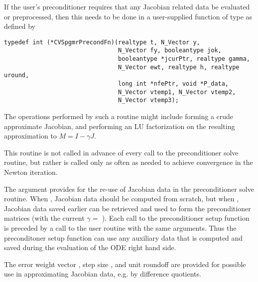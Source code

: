 \begin{itemize}
  If the user's preconditioner requires that any Jacobian related data
  be evaluated or preprocessed, then this needs to be done in a
  user-supplied {\C} function of type  as defined by
\begin{verbatim}
typedef int (*CVSpgmrPrecondFn)(realtype t, N_Vector y, 
                                N_Vector fy, booleantype jok, 
                                booleantype *jcurPtr, realtype gamma, 
                                N_Vector ewt, realtype h, realtype uround, 
                                long int *nfePtr, void *P_data, 
                                N_Vector vtemp1, N_Vector vtemp2,
                                N_Vector vtemp3);
\end{verbatim}
  
  The operations performed by such a routine might include forming a crude 
  approximate Jacobian, and performing an LU factorization on the resulting            
  approximation to $M=I - \gamma J$.
  
  This routine is not called in advance of every call to the preconditioner solve
  routine, but rather is called only as often as needed to achieve convergence in the
  Newton iteration. 
  
  The  argument provides for the re-use of
  Jacobian data in the preconditioner solve routine.  When , 
  Jacobian data should be computed from scratch, but when , 
  Jacobian data saved earlier can be retrieved and used to form the 
  preconditioner matrices (with the current $\gamma =$ ).
  Each call to the preconditioner setup function is preceded by a call to     
  the  user routine with the same  arguments.  
  Thus the preconditoner setup function can use any auxiliary data that is 
  computed and saved during the evaluation of the ODE right hand side.

  The error weight vector , step size , and unit roundoff    
   are provided for possible use   
  in approximating Jacobian data, e.g. by difference quotients.
  

\end{itemize}
